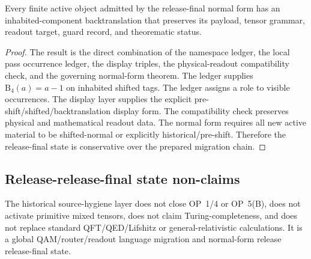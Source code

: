 \begin{theorem}
\label{thm:v400-release-final-conservativity}
Every finite active object admitted by the  release-final normal form
has an inhabited-component backtranslation that preserves its payload, tensor
grammar, readout target, guard record, and theorematic status.
\end{theorem}

\begin{proof}
The result is the direct combination of the namespace ledger, the local pass
occurrence ledger, the display triples, the physical-readout
compatibility check, and the governing normal-form theorem. The ledger
supplies $\mathrm B_4(a)=a-1$ on inhabited shifted tags. The ledger assigns a
role to visible occurrences. The display layer supplies the explicit
pre-shift/shifted/backtranslation display form. The compatibility check preserves
physical and mathematical readout data. The normal form requires all new
active material to be shifted-normal or explicitly historical/pre-shift. Therefore the
release-final state is conservative over the prepared migration chain.
\end{proof}

\subsection{Release-release-final state non-claims}
\label{subsec:v400-release-final-non-claims}

\begin{remark}
\label{rem:v400-release-final-non-claims}
The  historical source-hygiene layer does not close OP~1/4 or OP~5(B), does not
activate primitive mixed tensors, does not claim Turing-completeness, and does
not replace standard QFT/QED/Lifshitz or general-relativistic calculations. It
is a global QAM/router/readout language migration and normal-form release
release-final state.
\end{remark}



\clearpage
